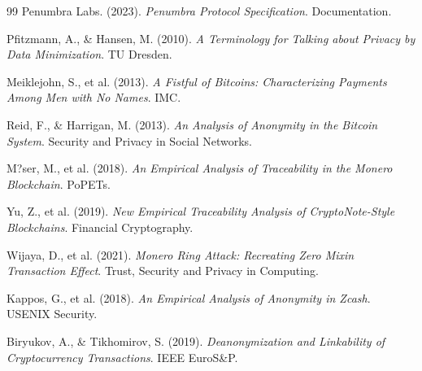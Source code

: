 \documentclass[11pt,a4paper,twoside]{book}
\begin{document}
\begin{thebibliography}{99}
 Penumbra Labs. (2023). \textit{Penumbra Protocol Specification}. Documentation.


 Pfitzmann, A., \& Hansen, M. (2010). \textit{A Terminology for Talking about Privacy by Data Minimization}. TU Dresden.

 Meiklejohn, S., et al. (2013). \textit{A Fistful of Bitcoins: Characterizing Payments Among Men with No Names}. IMC.

 Reid, F., \& Harrigan, M. (2013). \textit{An Analysis of Anonymity in the Bitcoin System}. Security and Privacy in Social Networks.

 M?ser, M., et al. (2018). \textit{An Empirical Analysis of Traceability in the Monero Blockchain}. PoPETs.

 Yu, Z., et al. (2019). \textit{New Empirical Traceability Analysis of CryptoNote-Style Blockchains}. Financial Cryptography.

 Wijaya, D., et al. (2021). \textit{Monero Ring Attack: Recreating Zero Mixin Transaction Effect}. Trust, Security and Privacy in Computing.

 Kappos, G., et al. (2018). \textit{An Empirical Analysis of Anonymity in Zcash}. USENIX Security.

 Biryukov, A., \& Tikhomirov, S. (2019). \textit{Deanonymization and Linkability of Cryptocurrency Transactions}. IEEE EuroS\&P.

\end{thebibliography}
\end{document}
